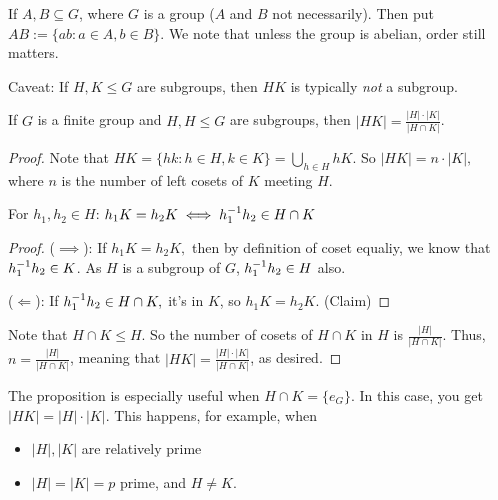 \documentclass[notes.tex]{subfiles}
\begin{document}

\begin{defn}
	If $A, B \subseteq G$, where $G$ is a group ($A$ and $B$ not necessarily). Then put $AB := \{ab : a\in A, b\in B\}$.
	We note that unless the group is abelian, order still matters.

	Caveat: If $H, K\le G$ are subgroups, then $HK$ is typically \emph{not} a subgroup.
\end{defn}

\begin{proposition}
	If $G$ is a finite group and $H, H\le G$ are subgroups, then $|HK| = \frac{|H|\cdot |K|}{|H\cap K|}$.
\end{proposition}
\begin{proof}
	Note that $HK = \{hk: h\in H, k\in K\} = \bigcup_{h\in H}hK$.
	So $|HK| = n\cdot |K|,$ where $n$ is the number of left cosets of $K$ meeting $H.$

	\begin{claim}
		For $h_1, h_2\in H$: $h_1K = h_2K \iff {h}^{-1}_1h_2 \in H\cap K$
	\end{claim}
	\begin{proof}
		($\implies$): If $h_1K = h_2K,$ then by definition of coset equaliy, we know that ${h}^{-1}_1h_2\in K$. As $H$ is a subgroup of $G$, ${h}^{-1}_1h_2\in H$ also.

		($\Longleftarrow$): If ${h}^{-1}_1h_2\in H\cap K,$ it's in $K$, so $h_1K = h_2K$. 
		\qedhere(Claim)
	\end{proof}
	Note that $H\cap K\le H$. So the number of cosets of $H\cap K$ in $H$ is $\frac{|H|}{|H\cap K|}$.
	Thus, $n = \frac{|H|}{|H\cap K|}$, meaning that $|HK| = \frac{|H|\cdot |K|}{|H\cap K|}$, as desired.
\end{proof}

\begin{remark}
	The proposition is especially useful when $H\cap K = \{e_G\}$. In this case, you get $|HK| = |H|\cdot|K|$.
	This happens, for example, when 
	\begin{itemize}
		\item $|H|, |K|$ are relatively prime
		\item $|H| = |K| = p$ prime, and $H\ne K$.
	\end{itemize}
\end{remark}
\end{document}
